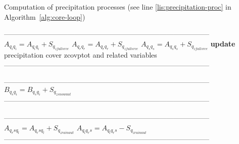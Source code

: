\documentclass[
a4paper,     %
12pt,        %
article,
onecolumn,   %
openany,     %
]{memoir}
\begin{document}
\newpage
%
\begin{algorithm}[H]
\caption{Computation of precipitation processes (see line \ref{lis:precipitation-proc} 
in Algorithm~\ref{alg:core-loop})}
\label{alg:cloud-proc}
\begin{algorithmic}
\vspace{.2cm}
\Indent
\vspace{-.2cm}
\State ---------------------------------------------------------------------------------------
\vspace{-.2cm}
\State $A_{q_i q_i} = A_{q_i q_i} + S_{q_{zfallsrce}}$
\State $A_{q_r q_r} = A_{q_r q_r} + S_{q_{zfallsrce}}$
\State $A_{q_s q_s} = A_{q_s q_s} + S_{q_{zfallsrce}}$
\State \textbf{update} precipitation cover zcovptot and related variables
\vspace{-.2cm}
\State ---------------------------------------------------------------------------------------
\vspace{.4cm}
\EndIndent

\Indent
\vspace{-.2cm}
\State ---------------------------------------------------------------------------------------
\vspace{-.2cm}
\State $B_{q_s q_i} = B_{q_s q_i} + S_{q_{zsnowaut}}$
\vspace{-.2cm}
\State ---------------------------------------------------------------------------------------
\vspace{.4cm}
\EndIndent

\Indent
\vspace{-.2cm}
\State ---------------------------------------------------------------------------------------
\vspace{-.2cm}
\State $A_{q_rs q_l} = A_{q_rs q_l} + S_{q_{zrainaut}}$
\State $A_{q_l q_rs} = A_{q_l q_rs} - S_{q_{zrainaut}}$
\vspace{-.2cm}
\State ---------------------------------------------------------------------------------------
\vspace{.4cm}
\EndIndent


\end{algorithmic}
\end{algorithm}
\end{document}
